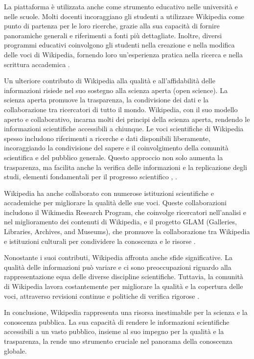 \documentclass[12pt,a4paper]{report}
\begin{document}
La piattaforma è utilizzata anche come strumento educativo nelle università e nelle scuole. Molti docenti incoraggiano gli studenti a utilizzare Wikipedia come punto di partenza per le loro ricerche, grazie alla sua capacità di fornire panoramiche generali e riferimenti a fonti più dettagliate. Inoltre, diversi programmi educativi coinvolgono gli studenti nella creazione e nella modifica delle voci di Wikipedia, fornendo loro un'esperienza pratica nella ricerca e nella scrittura accademica \cite{denning2005wikipedia}.

Un ulteriore contributo di Wikipedia alla qualità e all'affidabilità delle informazioni risiede nel suo sostegno alla scienza aperta (open science). La scienza aperta promuove la trasparenza, la condivisione dei dati e la collaborazione tra ricercatori di tutto il mondo. Wikipedia, con il suo modello aperto e collaborativo, incarna molti dei principi della scienza aperta, rendendo le informazioni scientifiche accessibili a chiunque. Le voci scientifiche di Wikipedia spesso includono riferimenti a ricerche e dati disponibili liberamente, incoraggiando la condivisione del sapere e il coinvolgimento della comunità scientifica e del pubblico generale. Questo approccio non solo aumenta la trasparenza, ma facilita anche la verifica delle informazioni e la replicazione degli studi, elementi fondamentali per il progresso scientifico \cite{fecher2014open}, \cite{nielsen2012reinventing}.

Wikipedia ha anche collaborato con numerose istituzioni scientifiche e accademiche per migliorare la qualità delle sue voci. Queste collaborazioni includono il Wikimedia Research Program, che coinvolge ricercatori nell'analisi e nel miglioramento dei contenuti di Wikipedia, e il progetto GLAM (Galleries, Libraries, Archives, and Museums), che promuove la collaborazione tra Wikipedia e istituzioni culturali per condividere la conoscenza e le risorse \cite{jemielniak2014wikipedia}.

Nonostante i suoi contributi, Wikipedia affronta anche sfide significative. La qualità delle informazioni può variare e ci sono preoccupazioni riguardo alla rappresentazione equa delle diverse discipline scientifiche. Tuttavia, la comunità di Wikipedia lavora costantemente per migliorare la qualità e la copertura delle voci, attraverso revisioni continue e politiche di verifica rigorose \cite{denning2005wikipedia}.

In conclusione, Wikipedia rappresenta una risorsa inestimabile per la scienza e la conoscenza pubblica. La sua capacità di rendere le informazioni scientifiche accessibili a un vasto pubblico, insieme al suo impegno per la qualità e la trasparenza, la rende uno strumento cruciale nel panorama della conoscenza globale.
\end{document}
